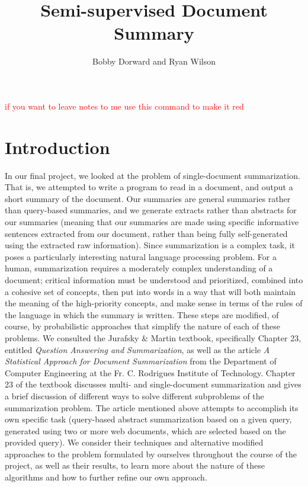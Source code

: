 \documentclass[12pt]{article}
\theoremstyle{plain}
\theoremstyle{definition}
\theoremstyle{remark}
\theoremstyle{plain}
\newcommand{\tre}{\textcolor{red}}
\begin{document}
\author{Bobby Dorward and Ryan Wilson}
\title{Semi-supervised Document Summary}
\maketitle

\tre{if you want to leave notes to me use this command to make it red}

\section{Introduction}
	In our final project, we looked at the problem of single-document summarization. That is, we attempted to write a program to read in a document, and output a short summary of the document. Our summaries are general summaries rather than query-based summaries, and we generate extracts rather than abstracts for our summaries (meaning that our summaries are made using specific informative sentences extracted from our document, rather than being fully self-generated using the extracted raw information).
	Since summarization is a complex task, it poses a particularly interesting natural language processing problem. For a human, summarization requires a moderately complex understanding of a document; critical information must be understood and prioritized, combined into a cohesive set of concepts, then put into words in a way that will both maintain the meaning of the high-priority concepts, and make sense in terms of the rules of the language in which the summary is written. These steps are modified, of course, by probabilistic approaches that simplify the nature of each of these problems.
	We consulted the Jurafsky \& Martin textbook, specifically Chapter 23, entitled \emph{Question Answering and Summarization}, as well as the article \emph{A Statistical Approach for Document Summarization} from the Department of Computer Engineering at the Fr. C. Rodrigues Institute of Technology. Chapter 23 of the textbook discusses multi- and single-document summarization and gives a brief discussion of different ways to solve different subproblems of the summarization problem. The article mentioned above attempts to accomplish its own specific task (query-based abstract summarization based on a given query, generated using two or more web documents, which are selected based on the provided query). We consider their techniques and alternative modified approaches to the problem formulated by ourselves throughout the course of the project, as well as their results, to learn more about the nature of these algorithms and how to further refine our own approach.
\end{document}
